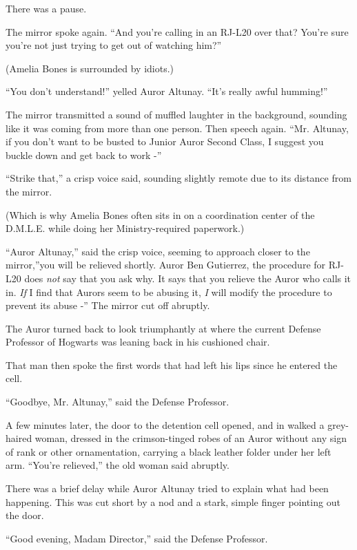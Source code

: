 There was a pause.

The mirror spoke again. ``And you're calling in an RJ-L20 over that?
You're sure you're not just trying to get out of watching him?''

(Amelia Bones is surrounded by idiots.)

``You don't understand!'' yelled Auror Altunay. ``It's really awful
humming!''

The mirror transmitted a sound of muffled laughter in the background,
sounding like it was coming from more than one person. Then speech
again. ``Mr. Altunay, if you don't want to be busted to Junior Auror
Second Class, I suggest you buckle down and get back to work -''

``Strike that,'' a crisp voice said, sounding slightly remote due to its
distance from the mirror.

(Which is why Amelia Bones often sits in on a coordination center of the
D.M.L.E. while doing her Ministry-required paperwork.)

``Auror Altunay,'' said the crisp voice, seeming to approach closer to
the mirror,''you will be relieved shortly. Auror Ben Gutierrez, the
procedure for RJ-L20 does \emph{not} say that you ask why. It says that
you relieve the Auror who calls it in. \emph{If} I find that Aurors seem
to be abusing it, \emph{I} will modify the procedure to prevent its
abuse -'' The mirror cut off abruptly.

The Auror turned back to look triumphantly at where the current Defense
Professor of Hogwarts was leaning back in his cushioned chair.

That man then spoke the first words that had left his lips since he
entered the cell.

``Goodbye, Mr. Altunay,'' said the Defense Professor.

A few minutes later, the door to the detention cell opened, and in
walked a grey-haired woman, dressed in the crimson-tinged robes of an
Auror without any sign of rank or other ornamentation, carrying a black
leather folder under her left arm. ``You're relieved,'' the old woman
said abruptly.

There was a brief delay while Auror Altunay tried to explain what had
been happening. This was cut short by a nod and a stark, simple finger
pointing out the door.

``Good evening, Madam Director,'' said the Defense Professor.

